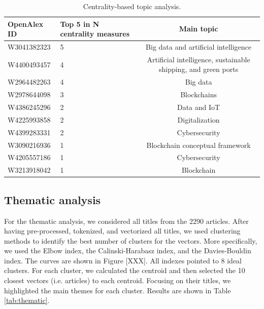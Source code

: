\documentclass[a4paper, review, endfloat, authoryear]{elsarticle}
\begin{document}
	\begin{table}[h]
		\centering
		\caption{Centrality-based topic analysis.}
		\begin{tabular}{l l c}
			\hline
			OpenAlex ID & Top 5 in N centrality measures & Main topic \\
			\hline
			W3041382323	& 5 & Big data and artificial intelligence\\
			W4400493457	& 4 & Artificial intelligence, sustainable shipping, and green ports\\
			W2964482263	& 4 & Big data\\
			W2978644098	& 3 & Blockchains\\
			W4386245296	& 2 & Data and IoT\\
			W4225993858	& 2 & Digitalization\\
			W4399283331	& 2 & Cybersecurity\\
			W3090216936	& 1 & Blockchain conceptual framework\\
			W4205557186	& 1 & Cybersecurity\\
			W3213918042	& 1 & Blockchain\\
			\hline
		\end{tabular}
		\label{tab:citationcentrality}
	\end{table}
		
	\subsection{Thematic analysis}
	For the thematic analysis, we considered all titles from the 2290 articles. After having pre-processed, tokenized, and vectorized all titles, we used clustering methods to identify the best number of clusters for the vectors. More specifically, we used the Elbow index, the Calinski-Harabasz index, and the Davies-Bouldin index. The curves are shown in Figure [XXX]. All indexes pointed to 8 ideal clusters. For each cluster, we calculated the centroid and then selected the 10 closest vectors (i.e. articles) to each centroid. Focusing on their titles, we highlighted the main themes for each cluster. Results are shown in Table \ref{tab:thematic}.
	
\end{document}
